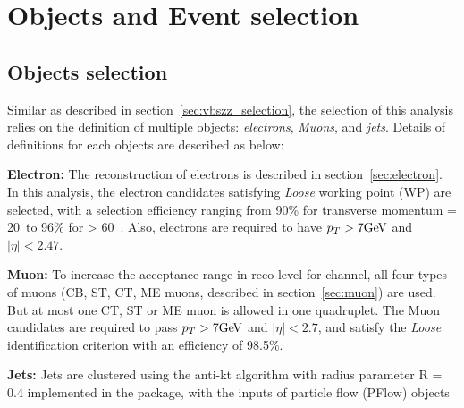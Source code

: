 \section{Objects and Event selection}
\label{sec:hmhzz_selection}

\subsection{Objects selection}

Similar as described in section~\ref{sec:vbszz_selection}, the selection of this analysis relies on the definition of multiple objects: \textit{electrons}, \textit{Muons}, and \textit{jets}.
Details of definitions for each objects are described as below:

\textbf{Electron:}
The reconstruction of electrons is described in section~\ref{sec:electron}.
In this analysis, the electron candidates satisfying \textit{Loose} working point (WP) are selected,
with a selection efficiency ranging from 90\% for transverse momentum \pt = 20~\gev to 96\% for \pt > 60~\gev.
Also, electrons are required to have $p_{T} > 7 \text{Ge\kern -0.1em V}$ and $|\eta| < 2.47$.

\textbf{Muon:}
To increase the acceptance range in reco-level for \lllljj channel, all four types of muons
(CB, ST, CT, ME muons, described in section~\ref{sec:muon}) are used.
But at most one CT, ST or ME muon is allowed in one \llll quadruplet.
The Muon candidates are required to pass $p_{T} > 7 \text{Ge\kern -0.1em V}$ and $|\eta| < 2.7$,
and satisfy the \textit{Loose} identification criterion with an efficiency of 98.5\%.

\textbf{Jets:}
Jets are clustered using the anti-kt algorithm with radius parameter R = 0.4 implemented in the package, with the inputs of particle flow (PFlow) objects
